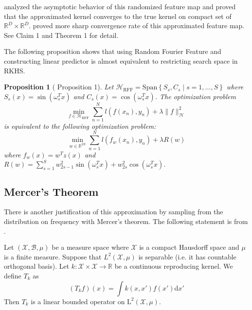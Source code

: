 \documentclass{amsart}
\newtheorem{proposition}[theorem]{Proposition}
\theoremstyle{definition}
\theoremstyle{remark}
\numberwithin{equation}{section}
\begin{document}
\cite{rahimi2007random} analyzed the asymptotic behavior of this randomized feature map and proved
that the approximated kernel converges to the true kernel on compact set of $\mathbb{R}^D\times \mathbb{R}^D$.
\cite{sriperumbudur2015optimal} proved more sharp convergence rate of this approximated feature map.
See \cite{rahimi2007random} Claim 1 and \cite{sriperumbudur2015optimal} Theorem 1 for detail.


The following proposition shows that using Random Fourier Feature and constructing linear predictor
is almost equivalent to restricting search space in RKHS.
\begin{proposition}[\cite{yang2012nystrom} Proposition 1]
Let $\mathcal{H}_{\mathrm{RFF}} = \mathrm{Span}\left\{ S_s, C_s \mid s = 1, \ldots, S \right\}$ where $S_s(x) = \sin (\omega_s^Tx)$ and $C_s(x) = \cos (\omega_s^Tx)$.
The optimization problem
\begin{equation}
\min_{f \in \mathcal{H}_{\mathrm{RFF}}} \sum_{n=1}^N l(f(x_n), y_n) + \lambda \|f\|^2_\mathcal{H}
\end{equation}
is equivalent to the following optimization problem:
\begin{equation}
\min_{w \in \mathbb{R}^{2S}} \sum_{n=1}^N l(f_w(x_n), y_n) + \lambda R(w)
\end{equation}
where $f_w(x) = w^T z(x)$ and $R(w) = \sum_{s=1}^{S} w_{2s-1}^2 \sin(\omega_s^Tx) + w_{2s}^2 \cos(\omega_s^Tx)$.
\end{proposition}

\subsection{Mercer's Theorem}
There is another justification of this approximation by sampling from the distribution on frequency with Mercer's theorem\cite{mercer1909functions}.
The following statement is from \cite{fukumizu2008}.

Let $(\mathcal{X}, \mathcal{B}, \mu)$ be a measure space where $\mathcal{X}$ is a compact Hausdorff space and $\mu$ is a finite measure. Suppose that $L^2(\mathcal{X}, \mu)$ is separable (i.e. it has countable orthogonal basis).
Let $k: \mathcal{X}\times \mathcal{X}\to \mathbb{R}$ be a continuous reproducing kernel.
We define $T_k$ as
\begin{equation}
(T_kf)(x) = \int k(x, x')f(x')\mathrm{d}x'
\end{equation}
Then $T_k$ is a linear bounded operator on $\mathrm{L}^2(\mathcal{X}, \mu)$.
\end{document}
